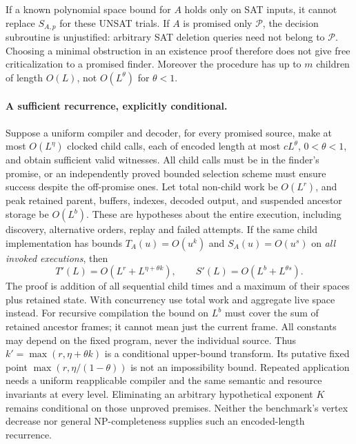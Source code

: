 \documentclass[11pt]{article}
\begin{document}
If a known polynomial space bound for $A$ holds only on SAT inputs, it cannot
replace $S_{A,p}$ for these UNSAT trials. If $A$ is promised only
$\mathcal P$, the decision subroutine is unjustified: arbitrary SAT deletion
queries need not belong to $\mathcal P$. Choosing a minimal obstruction in an
existence proof therefore does not give free criticalization to a promised
finder. Moreover the procedure has up to $m$ children of length $O(L)$, not
$O(L^\theta)$ for $\theta<1$.

\paragraph{A sufficient recurrence, explicitly conditional.}
Suppose a uniform compiler and decoder, for every promised source, make at
most $O(L^\eta)$ clocked child calls, each of encoded length at most
$cL^\theta$, $0<\theta<1$, and obtain sufficient valid witnesses. All child
calls must be in the finder's promise, or an independently proved bounded
selection scheme must ensure success despite the off-promise ones. Let total
non-child work be $O(L^r)$, and peak retained parent, buffers, indexes, decoded
output, and suspended ancestor storage be $O(L^b)$. These are hypotheses
about the entire execution, including discovery, alternative orders, replay
and failed attempts. If the same child implementation has bounds
$T_A(u)=O(u^k)$ and $S_A(u)=O(u^s)$ on \emph{all invoked executions}, then
\[
 T'(L)=O(L^r+L^{\eta+\theta k}),\qquad
 S'(L)=O(L^b+L^{\theta s}).
\]
The proof is addition of all sequential child times and a maximum of their
spaces plus retained state. With concurrency use total work and aggregate
live space instead. For recursive compilation the bound on $L^b$ must cover
the sum of retained ancestor frames; it cannot mean just the current frame.
All constants may depend on the fixed program, never the individual source.
Thus $k'=\max(r,\eta+\theta k)$ is a conditional upper-bound transform.
Its putative fixed point $\max(r,\eta/(1-\theta))$ is not an impossibility
bound. Repeated application needs a uniform reapplicable compiler and the
same semantic and resource invariants at every level. Eliminating an arbitrary
hypothetical exponent $K$ remains conditional on those unproved premises.
Neither the benchmark's vertex decrease nor general NP-completeness supplies
such an encoded-length recurrence.
\end{document}
